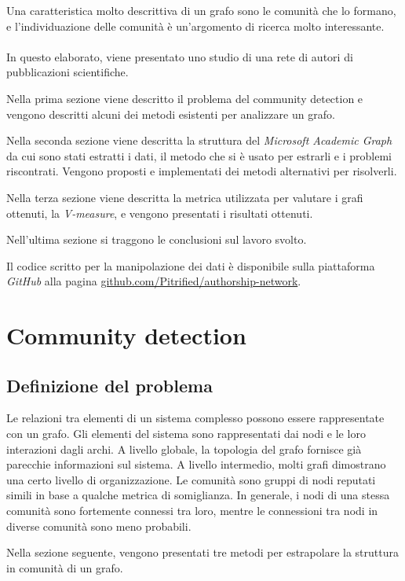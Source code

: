 \documentclass[12pt,a4paper,twoside]{report}
\begin{document}
Una caratteristica molto descrittiva di un grafo sono le comunità che lo formano, e l'individuazione
delle comunità è un'argomento di ricerca molto interessante.
\\
\\
In questo elaborato, viene presentato uno studio di una rete di autori di pubblicazioni
scientifiche.

Nella prima sezione viene descritto il problema del community detection e vengono descritti alcuni
dei metodi esistenti per analizzare un grafo.

Nella seconda sezione viene descritta la struttura del \textit{Microsoft Academic Graph} da cui sono
stati estratti i dati, il metodo che si è usato per estrarli e i problemi riscontrati. Vengono
proposti e implementati dei metodi alternativi per risolverli.

Nella terza sezione viene descritta la metrica utilizzata per valutare i grafi ottenuti, la
\textit{V-measure}, e vengono presentati i risultati ottenuti.

Nell'ultima sezione si traggono le conclusioni sul lavoro svolto.

Il codice scritto per la manipolazione dei dati è disponibile sulla piattaforma \textit{GitHub} alla
pagina \url{github.com/Pitrified/authorship-network}.


\whitePage
\chapter{Community detection} \label{cap:comdet}

\section{Definizione del problema} \label{sec:storia}

Le relazioni tra elementi di un sistema complesso possono essere rappresentate con un grafo. Gli
elementi del sistema sono rappresentati dai nodi e le loro interazioni dagli archi. A livello
globale, la topologia del grafo fornisce già parecchie informazioni sul sistema. A livello
intermedio, molti grafi dimostrano una certo livello di organizzazione. Le comunità sono gruppi di
nodi reputati simili in base a qualche metrica di somiglianza. In generale, i nodi di una stessa
comunità sono fortemente connessi tra loro, mentre le connessioni tra nodi in diverse comunità sono
meno probabili.

Nella sezione seguente, vengono presentati tre metodi per estrapolare la struttura in comunità di un
grafo.
\end{document}
